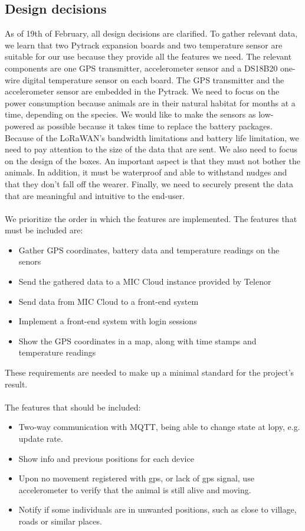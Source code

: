	\subsection{Design decisions}
		As of 19th of February, all design decisions are clarified. To gather relevant data, we learn that two Pytrack expansion boards and two temperature sensor are suitable for our use because they provide all the features we need. The relevant components are one GPS transmitter, accelerometer sensor and a DS18B20 one-wire digital temperature sensor on each board. The GPS transmitter and the accelerometer sensor are embedded in the Pytrack. We need to focus on the power consumption because animals are in their natural habitat for months at a time, depending on the species. We would like to make the sensors as low-powered as possible because it takes time to replace the battery packages. Because of the LoRaWAN’s bandwidth limitations and battery life limitation, we need to pay attention to the size of the data that are sent. We also need to focus on the design of the boxes. An important aspect is that they must not bother the animals. In addition, it must be waterproof and able to withstand nudges and that they don't fall off the wearer. Finally, we need to securely present the data that are meaningful and intuitive to the end-user.
		\\\\
		We prioritize the order in which the features are implemented. The features that must be included are:
		\begin{itemize}  
			\item Gather GPS coordinates, battery data and temperature readings on the senors
			\item Send the gathered data to a MIC Cloud instance provided by Telenor
			\item Send data from MIC Cloud to a front-end system
			\item Implement a front-end system with login sessions
			\item Show the GPS coordinates in a map, along with time stamps and temperature readings
		\end{itemize}
		These requirements are needed to make up a minimal standard for the project's result. 
		\\\\
		The features that should be included:
		\begin{itemize}  
			\item Two-way communication with MQTT, being able to change state at lopy, e.g. update rate. 
			\item Show info and previous positions for each device
			\item Upon no movement registered with gps, or lack of gps signal, use accelerometer to verify that the animal is still alive and moving. 
			\item Notify if some individuals are in unwanted positions, such as close to village, roads or similar places.
			
		\end{itemize}
